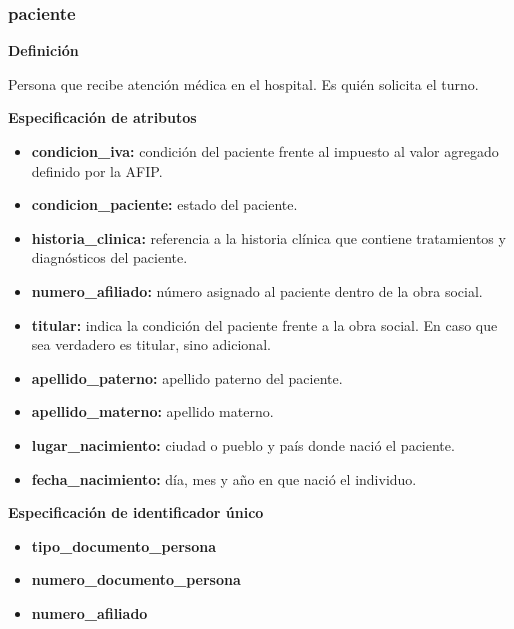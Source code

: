 \documentclass[a4paper,11pt]{article}
\begin{document}
\subsubsection{\textbf{paciente}}

\textbf{Definición}

Persona que recibe atención médica en el hospital. Es quién solicita el turno. 

\textbf{Especificación de atributos}

\begin{itemize}

  
   \item \textbf{condicion\_iva:} condición del paciente frente al impuesto al valor agregado 
   definido por la AFIP.

   \item \textbf{condicion\_paciente:} estado del paciente.

   \item \textbf{historia\_clinica:} referencia a la historia clínica que 
   contiene tratamientos y diagnósticos del paciente.

   \item \textbf{numero\_afiliado:} número asignado al paciente dentro de la obra social.

   \item \textbf{titular:} indica la condición del paciente frente a la obra social. En caso que sea verdadero es titular, sino adicional.
   
   \item \textbf{apellido\_paterno:} apellido paterno del paciente.

   \item \textbf{apellido\_materno:} apellido materno.
   
   \item \textbf{lugar\_nacimiento:} ciudad o pueblo y país donde nació el paciente.
	  
   \item \textbf{fecha\_nacimiento:} día, mes y año en que nació el individuo.
	
\end{itemize}

\textbf{Especificación de identificador único}

\begin{itemize}

    \item \textbf{tipo\_documento\_persona}

    \item \textbf{numero\_documento\_persona}

    \item \textbf{numero\_afiliado}

\end{itemize}
\end{document}
